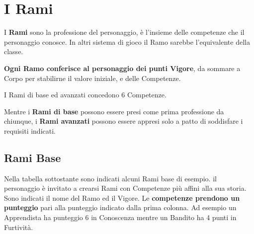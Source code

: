 \documentclass[12pt,a4paper,twoside,openany]{book}
\begin{document}
\pagebreak


\section{I Rami}

\begin{multicols}{2}

I \textbf{Rami} sono la professione del personaggio, è l'insieme delle competenze che il personaggio conosce. In altri sistema di gioco il Ramo sarebbe l'equivalente della classe.

\textbf{Ogni Ramo conferisce al personaggio dei punti Vigore}, da sommare a Corpo per stabilirne il valore iniziale, e delle Competenze.

I Rami di base ed avanzati concedono 6 Competenze.

Mentre i \textbf{Rami di base} possono essere presi come prima professione da chiunque, i\textbf{ Rami avanzati} possono essere appresi solo a patto di soddisfare i requisiti indicati.

\subsection{Rami Base}

Nella tabella sottostante sono indicati alcuni Rami base di esempio. il personaggio è invitato a crearsi Rami con Competenze più affini alla sua storia.
Sono indicati il nome del Ramo ed il Vigore. Le \textbf{competenze prendono un punteggio} pari alla punteggio indicato dalla prima colonna. Ad esempio un Apprendista ha punteggio 6 in Conoscenza mentre un Bandito ha 4 punti in Furtività.

\end{multicols}
\end{document}
